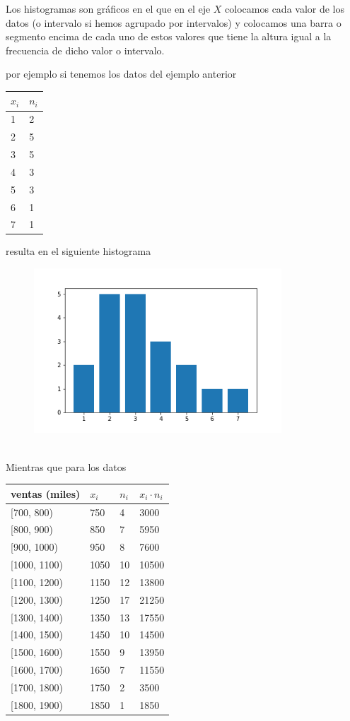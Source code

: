 \documentclass[
]{article}
\begin{document}
Los histogramas son gráficos en el que en el eje \(X\) colocamos cada
valor de los datos (o intervalo si hemos agrupado por intervalos) y
colocamos una barra o segmento encima de cada uno de estos valores que
tiene la altura igual a la frecuencia de dicho valor o intervalo.

por ejemplo si tenemos los datos del ejemplo anterior

\begin{longtable}[]{@{}ll@{}}
\toprule
\(x_i\) & \(n_i\)\tabularnewline
\midrule
\endhead
1 & 2\tabularnewline
2 & 5\tabularnewline
3 & 5\tabularnewline
4 & 3\tabularnewline
5 & 3\tabularnewline
6 & 1\tabularnewline
7 & 1\tabularnewline
\bottomrule
\end{longtable}

resulta en el siguiente histograma

\begin{figure}
\centering
\includegraphics[width=3.64583in,height=\textheight]{img/histograma.png}
\caption{~}
\end{figure}

Mientras que para los datos

\begin{longtable}[]{@{}llll@{}}
\toprule
ventas (miles) & \(x_i\) & \(n_i\) & \(x_i \cdot n_i\)\tabularnewline
\midrule
\endhead
{[}700, 800) & 750 & 4 & 3000\tabularnewline
{[}800, 900) & 850 & 7 & 5950\tabularnewline
{[}900, 1000) & 950 & 8 & 7600\tabularnewline
{[}1000, 1100) & 1050 & 10 & 10500\tabularnewline
{[}1100, 1200) & 1150 & 12 & 13800\tabularnewline
{[}1200, 1300) & 1250 & 17 & 21250\tabularnewline
{[}1300, 1400) & 1350 & 13 & 17550\tabularnewline
{[}1400, 1500) & 1450 & 10 & 14500\tabularnewline
{[}1500, 1600) & 1550 & 9 & 13950\tabularnewline
{[}1600, 1700) & 1650 & 7 & 11550\tabularnewline
{[}1700, 1800) & 1750 & 2 & 3500\tabularnewline
{[}1800, 1900) & 1850 & 1 & 1850\tabularnewline
\bottomrule
\end{longtable}
\end{document}
